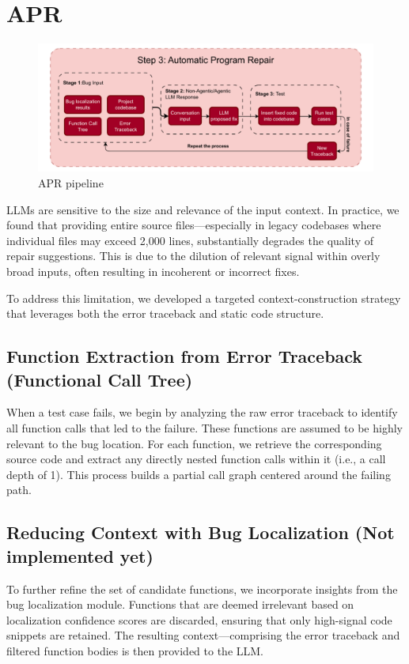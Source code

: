 \section{APR}

\begin{figure}[H]
\centering
\includegraphics[width=1\columnwidth]{Figures/Step3_APR.drawio.pdf}
\caption{APR pipeline}
\label{fig:step2_bug_localization}
\end{figure}

LLMs are sensitive to the size and relevance of the input context. In practice, we found that providing entire source files—especially in legacy codebases where individual files may exceed 2,000 lines, substantially degrades the quality of repair suggestions. This is due to the dilution of relevant signal within overly broad inputs, often resulting in incoherent or incorrect fixes.

To address this limitation, we developed a targeted context-construction strategy that leverages both the error traceback and static code structure.

\subsection{Function Extraction from Error Traceback (Functional Call Tree)}

When a test case fails, we begin by analyzing the raw error traceback to identify all function calls that led to the failure. These functions are assumed to be highly relevant to the bug location. For each function, we retrieve the corresponding source code and extract any directly nested function calls within it (i.e., a call depth of 1). This process builds a partial call graph centered around the failing path.

\subsection{Reducing Context with Bug Localization (Not implemented yet)}
To further refine the set of candidate functions, we incorporate insights from the bug localization module. Functions that are deemed irrelevant based on localization confidence scores are discarded, ensuring that only high-signal code snippets are retained. The resulting context—comprising the error traceback and filtered function bodies is then provided to the LLM.

